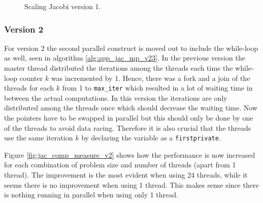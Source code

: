 \begin{figure}[H]
\centering
{}
\caption{Scaling Jacobi version 1.}
\label{fig:scaling_mp_jac_v1}
\end{figure}




\subsubsection{Version 2}

For version 2 the second parallel construct is moved out to include the while-loop as well, seen in algorithm \ref{alg:app_jac_mp_v23}. In the previous version the master thread distributed the iterations among the threads each time the while-loop counter $k$ was incremented by 1. Hence, there was a fork and a join of the threads for each $k$ from 1 to \texttt{max\_iter} which resulted in a lot of waiting time in between the actual computations. In this version the iterations are only distributed among the threads once which should decrease the waiting time. Now the pointers have to be swapped in parallel but this should only be done by one of the threads to avoid data racing. Therefore it is also crucial that the threads use the same iteration $k$ by declaring the variable as a \texttt{firstprivate}.

Figure \ref{fig:jac_comp_measure_v2} shows how the performance is now increased for each combination of problem size and number of threads (apart from 1 thread). The improvement is the most evident when using 24 threads, while it seems there is no improvement when using 1 thread. This makes sense since there is nothing running in parallel when using only 1 thread.

